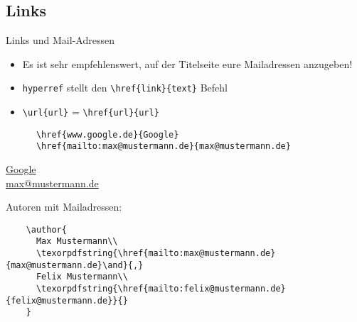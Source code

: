 \subsection{Links}
\begin{frame}[fragile]{Links und Mail-Adressen}
  \begin{itemize}
    \item Es ist sehr empfehlenswert, auf der Titelseite eure Mailadressen anzugeben!
    \item \texttt{hyperref} stellt den \lstinline+\href{link}{text}+ Befehl
    \item \lstinline+\url{url}+ = \lstinline+\href{url}{url}+
  \end{itemize}
  \vspace{-0.6em}
  \begin{CodeExample}{0.5}
    \begin{lstlisting}
      \href{www.google.de}{Google}
      \href{mailto:max@mustermann.de}{max@mustermann.de}
    \end{lstlisting}
  \CodeResult
    \strut
    \href{www.google.de}{Google}\\
    \href{mailto:max@mustermann.de}{max@mustermann.de}
  \end{CodeExample}
  \begin{block}{Autoren mit Mailadressen:}
    \begin{lstlisting}
    \author{
      Max Mustermann\\
      \texorpdfstring{\href{mailto:max@mustermann.de}{max@mustermann.de}\and}{,}
      Felix Mustermann\\
      \texorpdfstring{\href{mailto:felix@mustermann.de}{felix@mustermann.de}}{}
    }
    \end{lstlisting}
  \end{block}
\end{frame}
